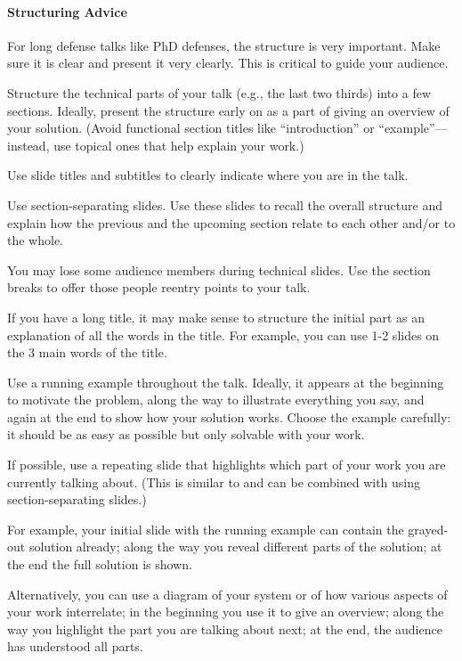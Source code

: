 \documentclass[12pt]{article}
\begin{document}
\paragraph{Structuring Advice}
For long defense talks like PhD defenses, the structure is very important.
Make sure it is clear and present it very clearly.
This is critical to guide your audience.
\begin{compactitem}
\item Structure the technical parts of your talk (e.g., the last two thirds) into a few sections.
 Ideally, present the structure early on as a part of giving an overview of your solution.
 (Avoid functional section titles like ``introduction'' or ``example''---instead, use topical ones that help explain your work.)
\item Use slide titles and subtitles to clearly indicate where you are in the talk. 
\item Use section-separating slides. Use these slides to recall the overall structure and explain how the previous and the upcoming section relate to each other and/or to the whole.
\item You may lose some audience members during technical slides. Use the section breaks to offer those people reentry points to your talk.
\end{compactitem}
\medskip

If you have a long title, it may make sense to structure the initial part as an explanation of all the words in the title.
For example, you can use 1-2 slides on the 3 main words of the title.
\medskip

Use a running example throughout the talk.
Ideally, it appears at the beginning to motivate the problem, along the way to illustrate everything you say, and again at the end to show how your solution works.
Choose the example carefully: it should be as easy as possible but only solvable with your work.
\medskip

If possible, use a repeating slide that highlights which part of your work you are currently talking about.
(This is similar to and can be combined with using section-separating slides.)

For example, your initial slide with the running example can contain the grayed-out solution already; along the way you reveal different parts of the solution; at the end the full solution is shown.

Alternatively, you can use a diagram of your system or of how various aspects of your work interrelate; in the beginning you use it to give an overview; along the way you highlight the part you are talking about next; at the end, the audience has understood all parts.
\medskip
\end{document}
